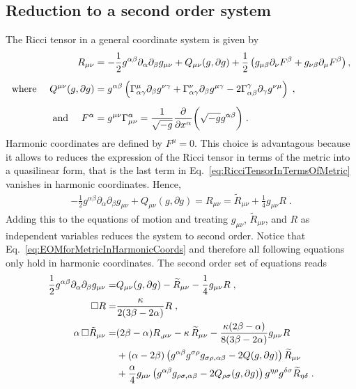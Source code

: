\documentclass[a4paper,oneside,openany,11pt]{memoir}
\numberwithin{equation}{section} %
\begin{document}
\subsection{Reduction to a second order system}

The Ricci tensor in a general coordinate system is given by
\begin{align}
	\label{eq:RicciTensorInTermsOfMetric}
	R_{\mu\nu}&=-\frac{1}{2}g^{\alpha\beta}\partial_{\alpha}\partial_{\beta}g_{\mu\nu}+Q_{\mu\nu}(g,\partial g)+\frac{1}{2}
\left(g_{\mu\beta}\partial_\nu F^\beta+g_{\nu\beta}\partial_\mu F^\beta\right),
	\\[0.5em]\notag
	\text{where }\quad
	Q^{\mu\nu}(g,\partial g)&=g^{\alpha\beta}\left(\Gamma_{\alpha\gamma}^{\mu}\partial_{\beta} g^{\nu\gamma}+\Gamma_{\alpha\gamma}^{\nu}\partial_{\beta} g^{\mu\gamma}-2\Gamma_{\alpha\beta}^{\gamma}\partial_{\gamma} g^{\nu\mu}\right)\;,
	\\[0.5em]\notag
	\text{and }\quad
	F^\alpha &= g^{\mu\nu}\Gamma_{\mu\nu}^\alpha = \frac{1}{\sqrt{-g}}\frac{\partial}{\partial x^\alpha}\bigg(\sqrt{-g}g^{\alpha\beta}\bigg)\;.
\end{align}
Harmonic coordinates are defined by $F^{\mu} = 0$. This choice is advantagous because it allows to reduces the expression of the Ricci tensor in terms of the metric into a quasilinear form, that is the last term in Eq.~\eqref{eq:RicciTensorInTermsOfMetric} vanishes in harmonic coordinates. Hence, 
\begin{align}
	\label{eq:EOMforMetricInHarmonicCoords}
	-\frac{1}{2}g^{\alpha\beta}\partial_{\alpha}\partial_{\beta}g_{\mu\nu}+Q_{\mu\nu}(g,\partial g) = R_{\mu\nu} = \widetilde{R}_{\mu\nu}
+\frac{1}{4}g_{\mu\nu}R\;.
\end{align}
Adding this to the equations of motion and treating $g_{\mu\nu}$, $\widetilde{R}_{\mu\nu}$, and $R$ as independent variables reduces the system to second order. Notice that Eq.~\eqref{eq:EOMforMetricInHarmonicCoords} and therefore all following equations only hold in harmonic coordinates. The second order set of equations reads
\begin{align}
	\frac{1}{2}g^{\alpha\beta}\partial_{\alpha}\partial_{\beta}g_{\mu\nu} = &Q_{\mu\nu}(g,\partial g)-\widetilde{R}_{\mu\nu}
-\frac{1}{4}g_{\mu\nu}R\;,
	\\
	\square R = &\frac{\kappa}{2(3\beta-2\alpha)}R\;,
	\\
	\alpha\,\square \tilde{R}_{\mu\nu} = &
	(2\beta-\alpha) R_{,\mu\nu} - \kappa\,\widetilde{R}_{\mu\nu}
	-\frac{\kappa(2\beta-\alpha)}{8(3\beta-2\alpha)}g_{\mu\nu} R
	\notag\\
	&+ (\alpha-2\beta)\left(g^{\alpha\beta}g^{\sigma\rho}g_{\sigma\rho,\alpha\beta}-2Q(g,\partial g)\right)\widetilde{R}_{\mu\nu}
	\notag\\
	&+\frac{\alpha}{4} g_{\mu\nu}\left(g^{\alpha\beta}g_{\rho\sigma,\alpha\beta}-2Q_{\rho\sigma}(g,\partial g)\right)g^{\eta\rho}g^{\delta\sigma} \widetilde{R}_{\eta\delta}\;.
\end{align}
\end{document}
